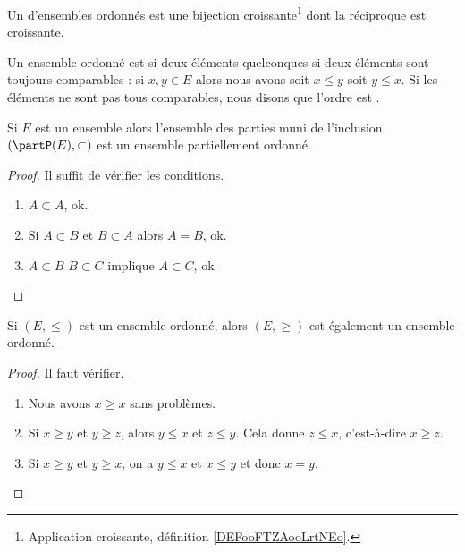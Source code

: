 \begin{definition}	\label{DEFooQEIAooGzzdiu}
	Un  d'ensembles ordonnés est une bijection croissante\footnote{Application croissante, définition \ref{DEFooFTZAooLrtNEo}.} dont la réciproque est croissante.
\end{definition}


\begin{definition}      \label{DEFooVGYQooUhUZGr}
	Un ensemble ordonné est  si deux éléments quelconques si deux éléments sont toujours comparables : si \( x,y\in E\) alors nous avons soit \( x\leq y\) soit \( y\leq x\). Si les éléments ne sont pas tous comparables, nous disons que l'ordre est .
\end{definition}


\begin{lemma}	\label{LEMooZUAZooFlziuO}
	Si \( E\) est un ensemble alors l'ensemble des parties muni de l'inclusion \( (\partP(E),\subset)\) est un ensemble partiellement ordonné.
\end{lemma}

\begin{proof}
	Il suffit de vérifier les conditions.
	\begin{enumerate}
		\item
		      \( A\subset A\), ok.
		\item
		      Si \( A\subset B\) et \( B\subset A\) alors \( A=B\), ok.
		\item
		      \( A\subset B\) \( B\subset C\) implique \( A\subset C\), ok.
	\end{enumerate}
\end{proof}

\begin{proposition}	\label{PROPooNPLNooTqXVYz}
	Si \( (E,\leq )\) est un ensemble ordonné, alors \( (E,\geq)\) est également un ensemble ordonné.
\end{proposition}

\begin{proof}
	Il faut vérifier.
	\begin{enumerate}
		\item
		      Nous avons \( x\geq x\) sans problèmes.
		\item
		      Si \( x\geq y\) et \( y\geq z\), alors \( y\leq x\) et \( z\leq y\). Cela donne \( z\leq x\), c'est-à-dire  \( x\geq z\).
		\item
		      Si \( x\geq y\) et \( y\geq x\), on a \( y\leq x\) et \( x\leq y\) et donc \( x=y\).
	\end{enumerate}
\end{proof}


